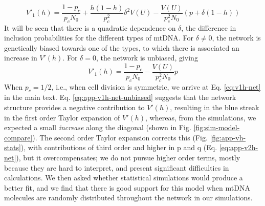 \documentclass{article}
\begin{document}
\begin{appendices}
\begin{equation}
V'_1(h) = \frac{1-p_c}{p_c N_0}
        +\frac{h(1-h)}{p_c^2}\delta^2V(U)
        -\frac{V(U)}{p_c^2N_0}(p+\delta (1-h))
\end{equation}
It will be seen that there is a quadratic dependence on $\delta$, the difference in inclusion probabilities for the different types of mtDNA. For $\delta\neq 0$, the network is genetically biased towards one of the types, to which there is associated an increase in $V'(h)$. For $\delta=0$, the network is unbiased, giving
\begin{equation}\label{eq:app-v1h-net-unbiased}
V'_1(h) = \frac{1-p_c}{p_c N_0}
        -\frac{V(U)}{p_c^2N_0}p
\end{equation}
When $p_c=1/2$, i.e., when cell division is symmetric, we arrive at Eq. \ref{eq:v1h-net} in the main text. Eq. \ref{eq:app-v1h-net-unbiased} suggests that the network structure provides a negative contribution to $V'(h)$, resulting in the blue streak in the first order Taylor expansion of $V'(h)$, whereas, from the simulations, we expected a small \textit{increase} along the diagonal (shown in Fig. \ref{fig:sim-model-compare}). The second order Taylor expansion corrects this (Fig. \ref{fig:app-vh-stats}), with contributions of third order and higher in p and q (Eq. \ref{eq:app-v2h-net}), but it overcompensates; we do not pursue higher order terms, mostly because they are hard to interpret, and present significant difficulties in calculations. We then asked whether statistical simulations would produce a better fit, and we find that there is good support for this model when mtDNA molecules are randomly distributed throughout the network in our simulations.%



\end{appendices}
\end{document}
